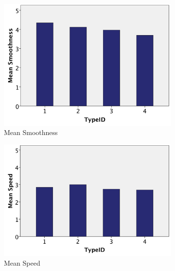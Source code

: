 \begin{figure}[h]
    \centering
    \begin{subfigure}[b]{0.4\textwidth}
        \centering
        \includegraphics[width=\textwidth]{figures/meanSmoothness}
        \caption{Mean Smoothness}
        \label{fig:meanSmoothness}
    \end{subfigure}
    \hfill
    \begin{subfigure}[b]{0.4\textwidth}
        \centering
        \includegraphics[width=\textwidth]{figures/meanSpeed}
        \caption{Mean Speed }
        \label{fig:meanSpeed}
    \end{subfigure}
    \hfill
    \begin{subfigure}[b]{0.4\textwidth}
        \centering

\end{subfigure}
\end{figure}
